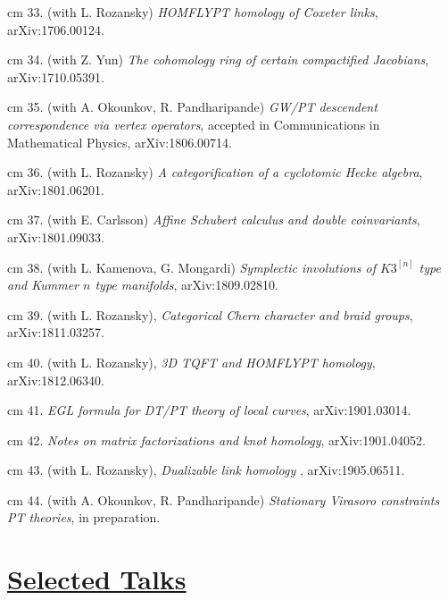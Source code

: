 \documentclass[11pt]{amsart}
\theoremstyle{plain}
\theoremstyle{definition}
\theoremstyle{remark}
\begin{document}
\noindent{} cm 33. (with L. Rozansky) {\it HOMFLYPT homology of Coxeter links},  arXiv:1706.00124.




\noindent{} cm 34. (with  Z. Yun) {\it The cohomology ring of certain compactified Jacobians},  arXiv:1710.05391. 


\noindent{} cm 35. (with A. Okounkov, R. Pandharipande) {\it  GW/PT descendent correspondence via vertex operators},
accepted in Communications in Mathematical Physics, arXiv:1806.00714.



\noindent{} cm 36. (with L. Rozansky)
{\it A categorification of a cyclotomic Hecke algebra}, arXiv:1801.06201.

\noindent{} cm 37. (with E. Carlsson)
{\it Affine Schubert calculus and double coinvariants}, arXiv:1801.09033.

\noindent{} cm 38. (with L. Kamenova, G. Mongardi) {\it Symplectic involutions of \(K3^{[n]}\) type and Kummer \(n\)
  type manifolds}, arXiv:1809.02810.

\noindent{} cm 39. (with L. Rozansky), {\it Categorical Chern character and braid groups}, arXiv:1811.03257.

\noindent{} cm 40. (with L. Rozansky), {\it 3D TQFT and HOMFLYPT homology}, arXiv:1812.06340.

\noindent{} cm 41. {\it EGL formula for DT/PT theory of local curves}, arXiv:1901.03014.

\noindent{} cm 42. {\it Notes on matrix factorizations and knot homology}, arXiv:1901.04052.

\noindent{} cm 43. (with L. Rozansky), {\it Dualizable link homology }, arXiv:1905.06511.



\noindent{} cm 44. (with A. Okounkov, R. Pandharipande)
{\it  Stationary Virasoro constraints PT theories}, in preparation.








\section*{\Large\underline{ Selected Talks}}



\medskip
\end{document}
